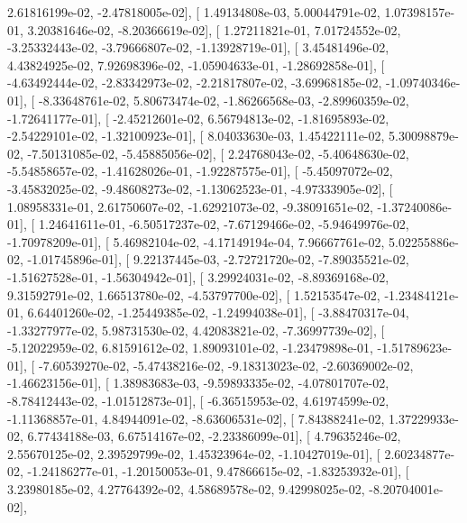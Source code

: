 \documentclass{article}
\begin{document}
          2.61816199e-02,  -2.47818005e-02],
       [  1.49134808e-03,   5.00044791e-02,   1.07398157e-01,
          3.20381646e-02,  -8.20366619e-02],
       [  1.27211821e-01,   7.01724552e-02,  -3.25332443e-02,
         -3.79666807e-02,  -1.13928719e-01],
       [  3.45481496e-02,   4.43824925e-02,   7.92698396e-02,
         -1.05904633e-01,  -1.28692858e-01],
       [ -4.63492444e-02,  -2.83342973e-02,  -2.21817807e-02,
         -3.69968185e-02,  -1.09740346e-01],
       [ -8.33648761e-02,   5.80673474e-02,  -1.86266568e-03,
         -2.89960359e-02,  -1.72641177e-01],
       [ -2.45212601e-02,   6.56794813e-02,  -1.81695893e-02,
         -2.54229101e-02,  -1.32100923e-01],
       [  8.04033630e-03,   1.45422111e-02,   5.30098879e-02,
         -7.50131085e-02,  -5.45885056e-02],
       [  2.24768043e-02,  -5.40648630e-02,  -5.54858657e-02,
         -1.41628026e-01,  -1.92287575e-01],
       [ -5.45097072e-02,  -3.45832025e-02,  -9.48608273e-02,
         -1.13062523e-01,  -4.97333905e-02],
       [  1.08958331e-01,   2.61750607e-02,  -1.62921073e-02,
         -9.38091651e-02,  -1.37240086e-01],
       [  1.24641611e-01,  -6.50517237e-02,  -7.67129466e-02,
         -5.94649976e-02,  -1.70978209e-01],
       [  5.46982104e-02,  -4.17149194e-04,   7.96667761e-02,
          5.02255886e-02,  -1.01745896e-01],
       [  9.22137445e-03,  -2.72721720e-02,  -7.89035521e-02,
         -1.51627528e-01,  -1.56304942e-01],
       [  3.29924031e-02,  -8.89369168e-02,   9.31592791e-02,
          1.66513780e-02,  -4.53797700e-02],
       [  1.52153547e-02,  -1.23484121e-01,   6.64401260e-02,
         -1.25449385e-02,  -1.24994038e-01],
       [ -3.88470317e-04,  -1.33277977e-02,   5.98731530e-02,
          4.42083821e-02,  -7.36997739e-02],
       [ -5.12022959e-02,   6.81591612e-02,   1.89093101e-02,
         -1.23479898e-01,  -1.51789623e-01],
       [ -7.60539270e-02,  -5.47438216e-02,  -9.18313023e-02,
         -2.60369002e-02,  -1.46623156e-01],
       [  1.38983683e-03,  -9.59893335e-02,  -4.07801707e-02,
         -8.78412443e-02,  -1.01512873e-01],
       [ -6.36515953e-02,   4.61974599e-02,  -1.11368857e-01,
          4.84944091e-02,  -8.63606531e-02],
       [  7.84388241e-02,   1.37229933e-02,   6.77434188e-03,
          6.67514167e-02,  -2.23386099e-01],
       [  4.79635246e-02,   2.55670125e-02,   2.39529799e-02,
          1.45323964e-02,  -1.10427019e-01],
       [  2.60234877e-02,  -1.24186277e-01,  -1.20150053e-01,
          9.47866615e-02,  -1.83253932e-01],
       [  3.23980185e-02,   4.27764392e-02,   4.58689578e-02,
          9.42998025e-02,  -8.20704001e-02],
\end{document}
